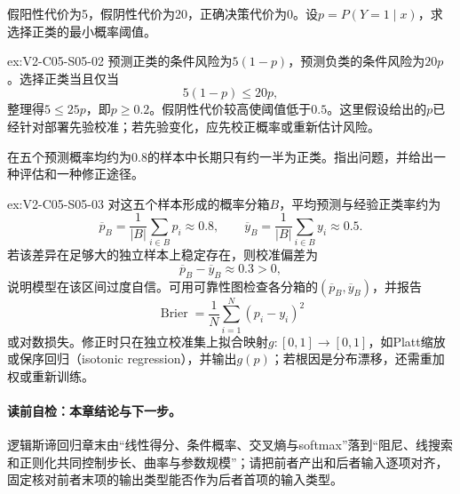 \begin{SLChapterExercisePairSection}
\begin{exercise}\label{ex:V2-C05-S05-02}
假阳性代价为5，假阴性代价为20，正确决策代价为0。设$p=P(Y=1\mid x)$，求选择正类的最小概率阈值。
\end{exercise}
\ifSLFullEdition
{}\label{sol:V2-C05-S05-02}
\begin{chapterexercisesolution}{ex:V2-C05-S05-02}
预测正类的条件风险为$5(1-p)$，预测负类的条件风险为$20p$。选择正类当且仅当
\[
5(1-p)\leq20p,
\]
整理得$5\leq25p$，即$p\geq0.2$。假阴性代价较高使阈值低于$0.5$。这里假设给出的$p$已经针对部署先验校准；若先验变化，应先校正概率或重新估计风险。
\end{chapterexercisesolution}
\fi

\begin{exercise}\label{ex:V2-C05-S05-03}
在五个预测概率均约为$0.8$的样本中长期只有约一半为正类。指出问题，并给出一种评估和一种修正途径。
\end{exercise}
\ifSLFullEdition
{}\label{sol:V2-C05-S05-03}
\begin{chapterexercisesolution}{ex:V2-C05-S05-03}
对这五个样本形成的概率分箱$B$，平均预测与经验正类率约为
\[
\overline p_B=\frac1{|B|}\sum_{i\in B}p_i\approx0.8,
\qquad
\overline y_B=\frac1{|B|}\sum_{i\in B}y_i\approx0.5.
\]
若该差异在足够大的独立样本上稳定存在，则校准偏差为
\[
\overline p_B-\overline y_B\approx0.3>0,
\]
说明模型在该区间过度自信。可用可靠性图检查各分箱的$(\overline p_B,\overline y_B)$，并报告
\[
\operatorname{Brier}=\frac1N\sum_{i=1}^{N}(p_i-y_i)^2
\]
或对数损失。修正时只在独立校准集上拟合映射$g:[0,1]\to[0,1]$，如Platt缩放或保序回归（isotonic regression），并输出$g(p)$；若根因是分布漂移，还需重加权或重新训练。
\end{chapterexercisesolution}
\fi

\end{SLChapterExercisePairSection}
\paragraph{读前自检：本章结论与下一步。}逻辑斯谛回归章末由“线性得分、条件概率、交叉熵与softmax”落到“阻尼、线搜索和正则化共同控制步长、曲率与参数规模”；请把前者产出和后者输入逐项对齐，固定核对前者末项的输出类型能否作为后者首项的输入类型。\par

